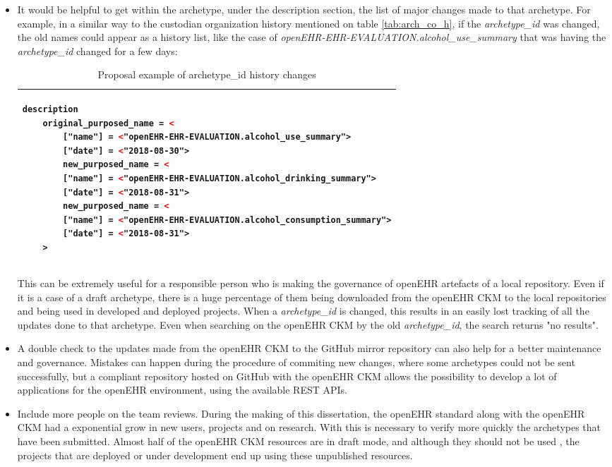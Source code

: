 \documentclass[mim_thesis.tex]{subfiles}
\begin{document}
\begin{itemize}
\item It would be helpful to get within the archetype, under the description section, the list of major changes made to that archetype. For example, in a similar way to the custodian organization history mentioned on table \ref{tab:arch_co_h}, if the \textit{archetype\_id} was changed, the old names could appear as a history list, like the case of \textit{openEHR-EHR-EVALUATION.alcohol\_use\_summary} that was having the \textit{archetype\_id} changed for a few days:

\begin{table}[H]
\caption{Proposal example of archetype\_id history changes}
\label{tab:ngmoduleexample}
\centering
\begin{tabular}{l}
\toprule[2pt]
\begin{lstlisting}[language=XML]
description
	original_purposed_name = <
		["name"] = <"openEHR-EHR-EVALUATION.alcohol_use_summary">
		["date"] = <"2018-08-30">
        new_purposed_name = <
		["name"] = <"openEHR-EHR-EVALUATION.alcohol_drinking_summary">
		["date"] = <"2018-08-31">
        new_purposed_name = <
		["name"] = <"openEHR-EHR-EVALUATION.alcohol_consumption_summary">
		["date"] = <"2018-08-31">
	>

\end{lstlisting}
\tabularnewline \bottomrule[2pt]
\end{tabular}
\end{table}

This can be extremely useful for a responsible person who is making the governance of openEHR artefacts of a local repository. Even if it is a case of a draft archetype, there is a huge percentage of them being downloaded from the openEHR CKM to the local repositories and being used in developed and deployed projects. When a \textit{archetype\_id} is changed, this results in an easily lost tracking of all the updates done to that archetype. Even when searching on the openEHR CKM by the old \textit{archetype\_id}, the search returns "no results".

\item A double check to the updates made from the openEHR CKM to the GitHub mirror repository can also help for a better maintenance and governance. Mistakes can happen during the procedure of commiting new changes, where some archetypes could not be sent successfully, but a compliant repository hosted on GitHub with the openEHR CKM allows the possibility to develop a lot of applications for the openEHR environment, using the available REST APIs. 

\item Include more people on the team reviews. During the making of this dissertation, the openEHR standard along with the openEHR CKM had a exponential grow in new users, projects and on research. With this is necessary to verify more quickly the archetypes that have been submitted. Almost half of the openEHR CKM resources are in draft mode, and although they should not be used \citep{ljosland2015national}, the projects that are deployed or under development end up using these unpublished resources.  

\end{itemize}   
\end{document}
